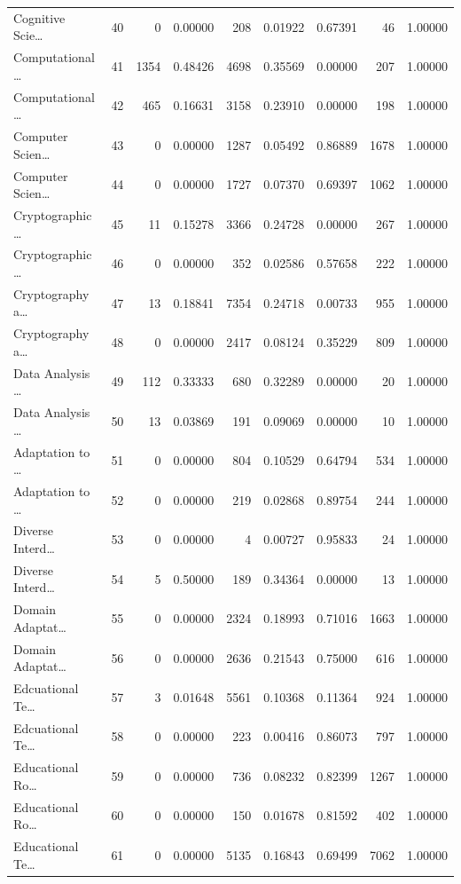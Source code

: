 \begin{table}
\begin{tabular}{lrrrrrrrr}
Cognitive Scie… & 40 & 0 & 0.00000 & 208 & 0.01922 & 0.67391 & 46 & 1.00000 \\
Computational … & 41 & 1354 & 0.48426 & 4698 & 0.35569 & 0.00000 & 207 & 1.00000 \\
Computational … & 42 & 465 & 0.16631 & 3158 & 0.23910 & 0.00000 & 198 & 1.00000 \\
Computer Scien… & 43 & 0 & 0.00000 & 1287 & 0.05492 & 0.86889 & 1678 & 1.00000 \\
Computer Scien… & 44 & 0 & 0.00000 & 1727 & 0.07370 & 0.69397 & 1062 & 1.00000 \\
Cryptographic … & 45 & 11 & 0.15278 & 3366 & 0.24728 & 0.00000 & 267 & 1.00000 \\
Cryptographic … & 46 & 0 & 0.00000 & 352 & 0.02586 & 0.57658 & 222 & 1.00000 \\
Cryptography a… & 47 & 13 & 0.18841 & 7354 & 0.24718 & 0.00733 & 955 & 1.00000 \\
Cryptography a… & 48 & 0 & 0.00000 & 2417 & 0.08124 & 0.35229 & 809 & 1.00000 \\
Data Analysis … & 49 & 112 & 0.33333 & 680 & 0.32289 & 0.00000 & 20 & 1.00000 \\
Data Analysis … & 50 & 13 & 0.03869 & 191 & 0.09069 & 0.00000 & 10 & 1.00000 \\
Adaptation to … & 51 & 0 & 0.00000 & 804 & 0.10529 & 0.64794 & 534 & 1.00000 \\
Adaptation to … & 52 & 0 & 0.00000 & 219 & 0.02868 & 0.89754 & 244 & 1.00000 \\
Diverse Interd… & 53 & 0 & 0.00000 & 4 & 0.00727 & 0.95833 & 24 & 1.00000 \\
Diverse Interd… & 54 & 5 & 0.50000 & 189 & 0.34364 & 0.00000 & 13 & 1.00000 \\
Domain Adaptat… & 55 & 0 & 0.00000 & 2324 & 0.18993 & 0.71016 & 1663 & 1.00000 \\
Domain Adaptat… & 56 & 0 & 0.00000 & 2636 & 0.21543 & 0.75000 & 616 & 1.00000 \\
Edcuational Te… & 57 & 3 & 0.01648 & 5561 & 0.10368 & 0.11364 & 924 & 1.00000 \\
Edcuational Te… & 58 & 0 & 0.00000 & 223 & 0.00416 & 0.86073 & 797 & 1.00000 \\
Educational Ro… & 59 & 0 & 0.00000 & 736 & 0.08232 & 0.82399 & 1267 & 1.00000 \\
Educational Ro… & 60 & 0 & 0.00000 & 150 & 0.01678 & 0.81592 & 402 & 1.00000 \\
Educational Te… & 61 & 0 & 0.00000 & 5135 & 0.16843 & 0.69499 & 7062 & 1.00000 \\

\end{tabular}
\end{table}

